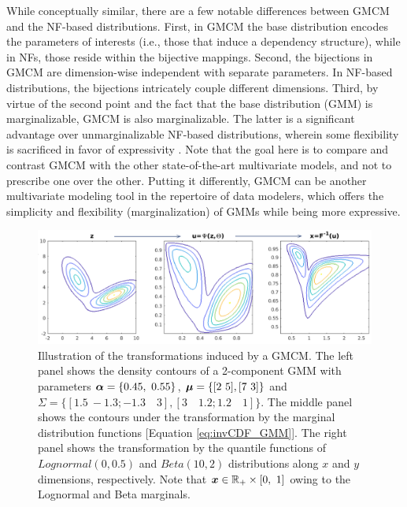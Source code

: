 \documentclass{article}
\theoremstyle{plain}
\theoremstyle{definition}
\theoremstyle{remark}
\begin{document}
While conceptually similar, there are a few notable differences between GMCM and the NF-based distributions. First, in GMCM the base distribution encodes the parameters of interests (i.e., those that induce a dependency structure), while in NFs, those reside within the bijective mappings. Second, the bijections in GMCM are dimension-wise independent with separate parameters. In NF-based distributions, the bijections intricately couple different dimensions. Third, by virtue of the second point and the fact that the base distribution (GMM) is marginalizable, GMCM is also marginalizable. The latter is a significant advantage over unmarginalizable NF-based distributions, wherein some flexibility is sacrificed in favor of expressivity \citep[see][for a detailed discussion on this subject]{Gilboa2021}. Note that the goal here is to compare and contrast GMCM with the other state-of-the-art multivariate models, and not to prescribe one over the other. Putting it differently, GMCM can be another multivariate modeling tool in the repertoire of data modelers, which offers the simplicity and flexibility (marginalization) of GMMs while being more expressive.

\begin{figure}[ht]
\vskip 0.2in
\begin{center}
\centerline{\includegraphics[width=\columnwidth]{figures/figure_gmcm_transformation}}
\caption{Illustration of the transformations induced by a GMCM. The left panel shows the density contours of a 2-component GMM with parameters $\bs{\alpha} = \{0.45, \ 0.55\}$, $\boldsymbol{\mu} =\{[2 \ 5], [7 \ 3] \}$ and  $ \Sigma= \{[1.5 \  -1.3 ; -1.3 \quad 3 ],[3 \quad 1.2 ; 1.2 \quad 1] \}$. The middle panel shows the contours under the transformation by the marginal distribution functions [Equation \eqref{eq:invCDF_GMM}]. The right panel shows the transformation  by the quantile functions of $Lognormal(0,0.5)$ and $Beta(10,2)$ distributions along $x$ and $y$ dimensions, respectively. Note that $\boldsymbol{x}\in \mathbb{R}_+\times [0,\ 1]$ owing to the Lognormal and Beta marginals.}
\label{fig:gmcm_transformation}
\end{center}
\vskip -0.2in
\end{figure}
\end{document}
